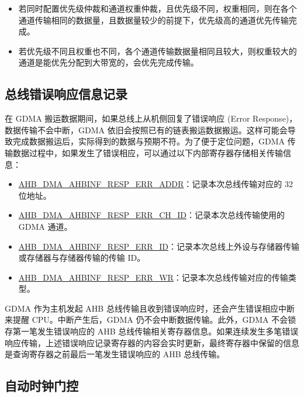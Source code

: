 \documentclass[main\_\_CN.tex]{subfiles}
\begin{document}
\begin{tiplisting}
\vspace{-2em}
\begin{itemize}
    \item 若同时配置优先级仲裁和通道权重仲裁，且优先级不同，权重相同，则在各个通道传输相同的数据量，且数据量较少的前提下，优先级高的通道优先传输完成。
    \item 若优先级不同且权重也不同，各个通道传输数据量相同且较大，则权重较大的通道是能优先分配到大带宽的，会优先完成传输。
\end{itemize}
\end{tiplisting}


\subsection{总线错误响应信息记录}\label{sec:dma-bus-error-resp}

在 GDMA 搬运数据期间，如果总线上从机侧回复了错误响应 (Error Response)，数据传输不会中断，GDMA 依旧会按照已有的链表搬运数据搬运。这样可能会导致完成数据搬运后，实际得到的数据与预期不符。为了便于定位问题，GDMA 传输数据过程中，如果发生了错误相应，可以通过以下内部寄存器存储相关传输信息：

\begin{itemize}
    \item \hyperref[fielddesc:AHBDMAAHBINFRESPERRADDR]{AHB\_DMA\_AHBINF\_RESP\_ERR\_ADDR}：记录本次总线传输对应的 32 位地址。
    \item \hyperref[fielddesc:AHBDMAAHBINFRESPERRCHID]{AHB\_DMA\_AHBINF\_RESP\_ERR\_CH\_ID}：记录本次总线传输使用的 GDMA 通道。
    \item \hyperref[fielddesc:AHBDMAAHBINFRESPERRID]{AHB\_DMA\_AHBINF\_RESP\_ERR\_ID}：记录本次总线上外设与存储器传输或存储器与存储器传输的传输 ID。
    \item \hyperref[fielddesc:AHBDMAAHBINFRESPERRWR]{AHB\_DMA\_AHBINF\_RESP\_ERR\_WR}：记录本次总线传输对应的传输类型。
\end{itemize}

GDMA 作为主机发起 AHB 总线传输且收到错误响应时，还会产生错误相应中断来提醒 CPU。中断产生后，GDMA 仍不会中断数据传输。此外，GDMA 不会锁存第一笔发生错误响应的 AHB 总线传输相关寄存器信息。如果连续发生多笔错误响应传输，上述错误响应记录寄存器的内容会实时更新，最终寄存器中保留的信息是查询寄存器之前最后一笔发生错误响应的 AHB 总线传输。

\subsection{自动时钟门控}\label{sec:dma-auto-clk-gating}
\end{document}

